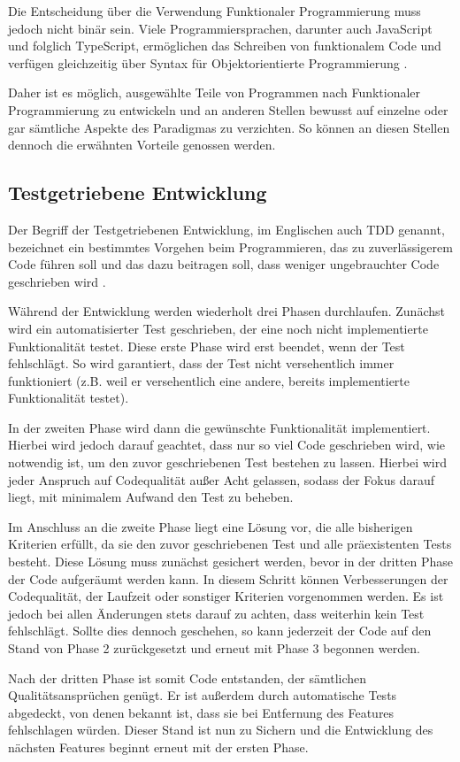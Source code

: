 Die Entscheidung über die Verwendung Funktionaler Programmierung muss jedoch nicht binär sein. Viele Programmiersprachen, darunter auch JavaScript und folglich TypeScript, ermöglichen das Schreiben von funktionalem Code und verfügen gleichzeitig über Syntax für Objektorientierte Programmierung \citep{benton2016js_functional}.

Daher ist es möglich, ausgewählte Teile von Programmen nach Funktionaler Programmierung zu entwickeln und an anderen Stellen bewusst auf einzelne oder gar sämtliche Aspekte des Paradigmas zu verzichten. So können an diesen Stellen dennoch die erwähnten Vorteile genossen werden.

\subsection{Testgetriebene Entwicklung}
\label{state_of_the_art:tdd}
Der Begriff der Testgetriebenen Entwicklung, im Englischen auch \gls{TDD} genannt, bezeichnet ein bestimmtes Vorgehen beim Programmieren, das zu zuverlässigerem Code führen soll und das dazu beitragen soll, dass weniger ungebrauchter Code geschrieben wird \cite{tdd_beck}.

Während der Entwicklung werden wiederholt drei Phasen durchlaufen. Zunächst wird ein automatisierter Test geschrieben, der eine noch nicht implementierte Funktionalität testet. Diese erste Phase wird erst beendet, wenn der Test fehlschlägt. So wird garantiert, dass der Test nicht versehentlich immer funktioniert (z.B. weil er versehentlich eine andere, bereits implementierte Funktionalität testet).

In der zweiten Phase wird dann die gewünschte Funktionalität implementiert. Hierbei wird jedoch darauf geachtet, dass nur so viel Code geschrieben wird, wie notwendig ist, um den zuvor geschriebenen Test bestehen zu lassen. Hierbei wird jeder Anspruch auf Codequalität außer Acht gelassen, sodass der Fokus darauf liegt, mit minimalem Aufwand den Test zu beheben.

Im Anschluss an die zweite Phase liegt eine Lösung vor, die alle bisherigen Kriterien erfüllt, da sie den zuvor geschriebenen Test und alle präexistenten Tests besteht. Diese Lösung muss zunächst gesichert werden, bevor in der dritten Phase der Code aufgeräumt werden kann. In diesem Schritt können Verbesserungen der Codequalität, der Laufzeit oder sonstiger Kriterien vorgenommen werden. Es ist jedoch bei allen Änderungen stets darauf zu achten, dass weiterhin kein Test fehlschlägt. Sollte dies dennoch geschehen, so kann jederzeit der Code auf den Stand von Phase 2 zurückgesetzt und erneut mit Phase 3 begonnen werden.

Nach der dritten Phase ist somit Code entstanden, der sämtlichen Qualitätsansprüchen genügt. Er ist außerdem durch automatische Tests abgedeckt, von denen bekannt ist, dass sie bei Entfernung des Features fehlschlagen würden. Dieser Stand ist nun zu Sichern und die Entwicklung des nächsten Features beginnt erneut mit der ersten Phase.
